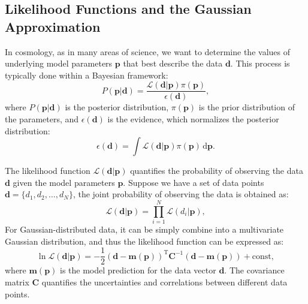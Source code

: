 \subsection{Likelihood Functions and the Gaussian Approximation}
In cosmology, as in many areas of science, we want to determine the values of underlying model parameters $\mathbf{p}$ that best describe the data $\mathbf{d}$. This process is typically done within a Bayesian framework:
\begin{equation}
    P(\mathbf{p} | \mathbf{d}) = \frac{\mathcal{L}(\mathbf{d} | \mathbf{p}) \pi(\mathbf{p})}{\mathbf{\mathcal{\epsilon}}(\mathbf{d})},
\end{equation}
where $P(\mathbf{p} | \mathbf{d})$ is the posterior distribution, $\pi(\mathbf{p})$ is the prior distribution of the parameters, and $\mathbf{\mathcal{\epsilon}}(\mathbf{d})$ is the evidence, which normalizes the posterior distribution:
\begin{equation}
    \mathbf{\mathcal{\epsilon}}(\mathbf{d}) = \int \mathcal{L}(\mathbf{d} | \mathbf{p}) \pi(\mathbf{p}) \, \mathrm{d} \mathbf{p}.
\end{equation}

The likelihood function $\mathcal{L}(\mathbf{d} | \mathbf{p})$ quantifies the probability of observing the data $\mathbf{d}$ given the model parameters $\mathbf{p}$. Suppose we have a set of data points $\mathbf{d} = \{d_1, d_2, \ldots, d_N\}$, the joint probability of observing the data is obtained as:
\begin{equation}
    \mathcal{L}(\mathbf{d} | \mathbf{p}) = \prod_{i=1}^{N} \mathcal{L}(d_i | \mathbf{p}),
\end{equation}
For Gaussian-distributed data, it can be simply combine into a multivariate Gaussian distribution, and thus the likelihood function can be expressed as:
\begin{equation}
    \ln \mathcal{L}(\mathbf{d} | \mathbf{p}) = -\frac{1}{2}(\mathbf{d} - \mathbf{m}(\mathbf{p}))^{\mathrm{T}} \mathbf{C}^{-1} (\mathbf{d} - \mathbf{m}(\mathbf{p})) + \mathrm{const},
\end{equation}
where $\mathbf{m}(\mathbf{p})$ is the model prediction for the data vector $\mathbf{d}$. The covariance matrix $\mathbf{C}$ quantifies the uncertainties and correlations between different data points.

